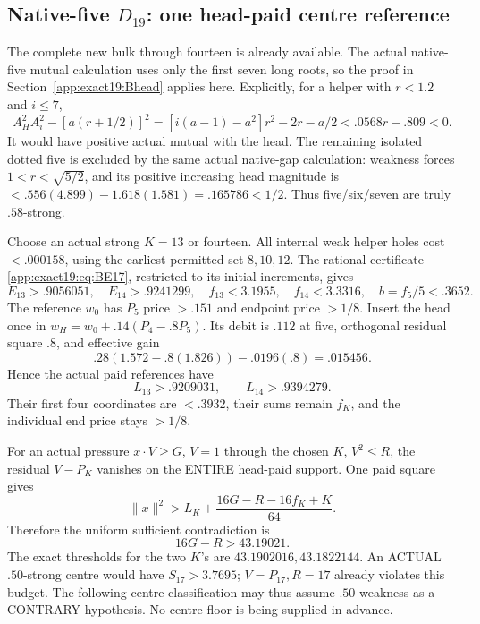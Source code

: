 \documentclass[11pt]{article}
\theoremstyle{definition}
\theoremstyle{remark}
\begin{document}
\subsection{Native-five \(D_{19}\): one head-paid centre reference}
\label{app:exact19:Dfivereference}

The complete new bulk through
fourteen is already available.
The actual native-five mutual
calculation uses only the first
seven long roots, so the proof
in Section~\ref{app:exact19:Bhead}
applies here.
Explicitly, for a helper with
\(r<1.2\) and \(i\le7\),
\[
 A_H^2A_i^2-[a(r+1/2)]^2
 =[i(a-1)-a^2]r^2-2r-a/2
                                <.0568r-.809<0 .
\]
It would have positive actual
mutual with the head.
The remaining isolated dotted
five is excluded by the same
actual native-gap calculation:
weakness forces
\(1<r<\sqrt{5/2}\), and its
positive increasing head
magnitude is
\(<.556(4.899)-1.618(1.581)
=.165786<1/2\).
Thus five/six/seven are truly
\(.58\)-strong.

Choose an actual strong
\(K=13\) or fourteen.
All internal weak helper holes
cost \(<.000158\), using the
earliest permitted set \(8,10,12\).
The rational certificate
\eqref{app:exact19:eq:BE17},
restricted to its initial
increments, gives
\[
 E_{13}>.9056051,\quad E_{14}>.9241299,\quad
 f_{13}<3.1955,\quad f_{14}<3.3316,\quad b=f_5/5<.3652 .
\]
The reference \(w_0\) has \(P_5\)
price \(>.151\) and endpoint
price \(>1/8\).
Insert the head once in
\(w_H=w_0+.14(P_4-.8P_5)\).
Its debit is \(.112\) at five,
orthogonal residual square \(.8\),
and effective gain
\[
                   .28(1.572-.8(1.826))-.0196(.8)=.015456 .
\]
Hence the actual paid references
have
\[
                        L_{13}>.9209031,\qquad L_{14}>.9394279 .
\]
Their first four coordinates are
\(<.3932\), their sums remain
\(f_K\), and the individual end
price stays \(>1/8\).

For an actual pressure
\(x\cdot V\ge G\), \(V=1\)
through the chosen \(K\),
\(V^2\le R\), the residual
\(V-P_K\) vanishes on the
ENTIRE head-paid support.
One paid square gives
\[
 \|x\|^2>L_K+\frac{16G-R-16f_K+K}{64}.
\tag{D19fivepay}\label{app:exact19:eq:Dfivepay}
\]
Therefore the uniform sufficient
contradiction is
\[
                              16G-R>43.19021 .
\tag{D19fivebudget}\label{app:exact19:eq:Dfivebudget}
\]
The exact thresholds for the
two \(K\)'s are
\(43.1902016,43.1822144\).
An ACTUAL \(.50\)-strong centre
would have \(S_{17}>3.7695\);
\(V=P_{17},R=17\) already
violates this budget.
The following centre classification
may thus assume \(.50\) weakness
as a CONTRARY hypothesis.
No centre floor is being supplied
in advance.
\end{document}
